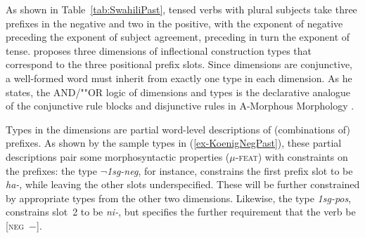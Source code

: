 \documentclass[output=paper,biblatex,babelshorthands,newtxmath,draftmode,colorlinks,citecolor=brown]{langscibook}
\begin{document}
As shown in Table~\ref{tab:SwahiliPast}, tensed verbs with plural
subjects take three prefixes in the negative and two in the positive, with
the exponent of negative preceding the exponent of subject agreement,
preceding in turn the exponent of tense. \citet{Koenig99} proposes
three dimensions of inflectional construction types that correspond to
the three positional prefix slots. Since dimensions are conjunctive, a
well-formed  word must inherit from exactly one type in each
dimension. As he states, the AND/""OR logic of dimensions and types is
the declarative analogue of the conjunctive rule blocks and
disjunctive rules in A-Morphous Morphology \citep{Anderson92}.

Types in the dimensions are partial word-level descriptions of
(combinations of) prefixes. As shown by the sample types in (\ref{ex-KoenigNegPast}), these partial descriptions pair some
morphosyntactic properties (\textsc{$\mu$-feat}) with constraints on
the prefixes: the type \textit{$\neg$1sg-neg}, for instance, constrains the
first prefix slot to be \textit{ha-}, while leaving the other slots
underspecified. These will be further constrained by appropriate types
from the other two dimensions. Likewise, the type \textit{1sg-pos},
constrains slot~2 to be \textit{ni-}, but specifies the further
requirement that the verb be \textsc{[neg~$-$]}.    
\end{document}
